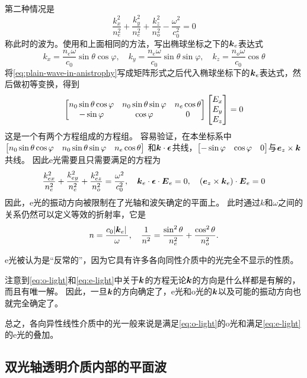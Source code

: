 第二种情况是
\[
    \frac{k_x^2}{n_e^2} + \frac{k_y^2}{n_e^2} + \frac{k_z^2}{n_o^2} - \frac{\omega^2}{c_0^2} = 0
\]
称此时的波为。使用和上面相同的方法，写出椭球坐标之下的$\vb*{k}_e$表达式
\[
    k_x = \frac{n_e \omega}{c_0} \sin \theta \cos \varphi, \quad k_y = \frac{n_e \omega}{c_0} \sin \theta \sin \varphi, \quad k_z = \frac{n_o \omega}{c_0} \cos \theta
\]
将\eqref{eq:plain-wave-in-anistrophy}写成矩阵形式之后代入椭球坐标下的$\vb*{k}_e$表达式，然后做初等变换，得到
\[
    \bmqty{
        n_0 \sin \theta \cos \varphi & n_0 \sin \theta \sin \varphi & n_e \cos \theta \\
        -\sin \varphi & \cos \varphi & 0
    }
    \bmqty{E_x \\ E_y \\ E_z} = 0
\]
这是一个有两个方程组成的方程组。
容易验证，在本坐标系中$\bmqty{n_0 \sin \theta \cos \varphi & n_0 \sin \theta \sin \varphi & n_e \cos \theta}$
和$\vb*{k} \cdot \vb*{\epsilon}$共线，$\bmqty{-\sin \varphi & \cos \varphi & 0}$与$\vb*{e}_z \times \vb*{k}$共线。
因此e光需要且只需要满足的方程为
\begin{equation}
    \frac{k_{ex}^2}{n_e^2} + \frac{k_{ey}^2}{n_e^2} + \frac{k_{ez}^2}{n_o^2} =
    \frac{\omega^2}{c_0^2}, \quad \vb*{k}_e \cdot \vb*{\epsilon} \cdot \vb*{E}_e = 0, \quad (\vb*{e}_z \times \vb*{k}_e) \cdot \vb*{E}_e = 0
    \label{eq:e-light}
\end{equation}
因此，e光的振动方向被限制在了光轴和波矢确定的平面上。
此时通过$k$和$\omega$之间的关系仍然可以定义等效的折射率，它是
\begin{equation}
    n = \frac{c_0 \abs*{\vb*{k}_e}}{\omega} , \quad \frac{1}{n^2} = \frac{\sin^2 \theta}{n_e^2} + \frac{\cos^2 \theta}{n_o^2}.
    \label{eq:e-light-effective-index}
\end{equation}

e光被认为是“反常的”，因为它具有许多各向同性介质中的光完全不显示的性质。

注意到\eqref{eq:o-light}和\eqref{eq:e-light}中关于$\vb*{k}$的方程无论$\vb*{k}$的方向是什么样都是有解的，而且有唯一解。
因此，一旦$\vb*{k}$的方向确定了，e光和o光的$\vb*{k}$以及可能的振动方向也就完全确定了。

总之，各向异性线性介质中的光一般来说是满足\eqref{eq:o-light}的o光和满足\eqref{eq:e-light}的e光的叠加。


\subsection{双光轴透明介质内部的平面波}

